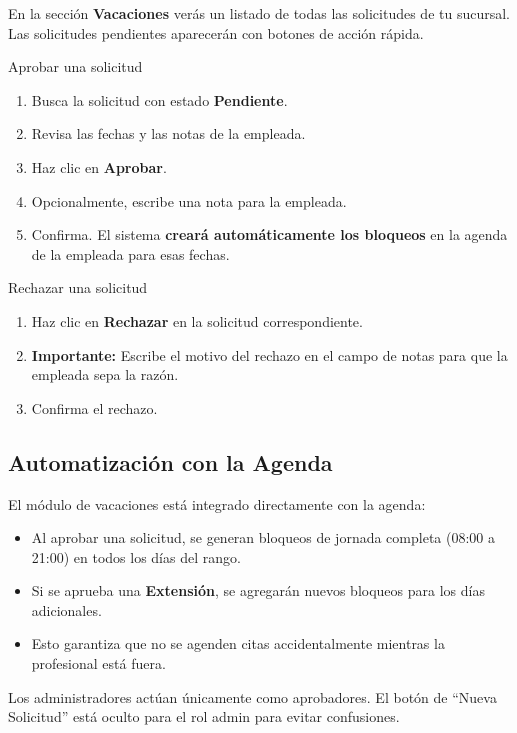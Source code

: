 \documentclass[12pt,a4paper]{article}
\begin{document}
En la sección \textbf{Vacaciones} verás un listado de todas las solicitudes de tu sucursal. Las solicitudes pendientes aparecerán con botones de acción rápida.

\begin{pasobox}{Aprobar una solicitud}
\begin{enumerate}[leftmargin=*]
  \item Busca la solicitud con estado \textbf{Pendiente}.
  \item Revisa las fechas y las notas de la empleada.
  \item Haz clic en \textbf{Aprobar}.
  \item Opcionalmente, escribe una nota para la empleada.
  \item Confirma. El sistema \textbf{creará automáticamente los bloqueos} en la agenda de la empleada para esas fechas.
\end{enumerate}
\end{pasobox}

\begin{pasobox}{Rechazar una solicitud}
\begin{enumerate}[leftmargin=*]
  \item Haz clic en \textbf{Rechazar} en la solicitud correspondiente.
  \item \textbf{Importante:} Escribe el motivo del rechazo en el campo de notas para que la empleada sepa la razón.
  \item Confirma el rechazo.
\end{enumerate}
\end{pasobox}

\subsection{Automatización con la Agenda}

El módulo de vacaciones está integrado directamente con la agenda:
\begin{itemize}[leftmargin=*]
  \item Al aprobar una solicitud, se generan bloqueos de jornada completa (08:00 a 21:00) en todos los días del rango.
  \item Si se aprueba una \textbf{Extensión}, se agregarán nuevos bloqueos para los días adicionales.
  \item Esto garantiza que no se agenden citas accidentalmente mientras la profesional está fuera.
\end{itemize}

\begin{notabox}
Los administradores actúan únicamente como aprobadores. El botón de ``Nueva Solicitud'' está oculto para el rol admin para evitar confusiones.
\end{notabox}
\end{document}
